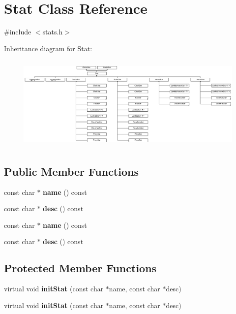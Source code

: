 \hypertarget{classStat}{\section{Stat Class Reference}
\label{classStat}
}


{\ttfamily \#include $<$stats.\-h$>$}

Inheritance diagram for Stat\-:\begin{figure}[H]
\begin{center}
\leavevmode
\includegraphics[height=4.696774cm]{classStat}
\end{center}
\end{figure}
\subsection*{Public Member Functions}
\begin{DoxyCompactItemize}
\item 
\hypertarget{classStat_aea49cf6f8f4f7e5e979bfc7b4530d7f7}{const char $\ast$ {\bfseries name} () const }\label{classStat_aea49cf6f8f4f7e5e979bfc7b4530d7f7}

\item 
\hypertarget{classStat_a698789405d2c18bfbdb405d63df088cb}{const char $\ast$ {\bfseries desc} () const }\label{classStat_a698789405d2c18bfbdb405d63df088cb}

\item 
\hypertarget{classStat_aea49cf6f8f4f7e5e979bfc7b4530d7f7}{const char $\ast$ {\bfseries name} () const }\label{classStat_aea49cf6f8f4f7e5e979bfc7b4530d7f7}

\item 
\hypertarget{classStat_a698789405d2c18bfbdb405d63df088cb}{const char $\ast$ {\bfseries desc} () const }\label{classStat_a698789405d2c18bfbdb405d63df088cb}

\end{DoxyCompactItemize}
\subsection*{Protected Member Functions}
\begin{DoxyCompactItemize}
\item 
\hypertarget{classStat_ac730651cf624a85fd23a0ff56e1804a3}{virtual void {\bfseries init\-Stat} (const char $\ast$name, const char $\ast$desc)}\label{classStat_ac730651cf624a85fd23a0ff56e1804a3}

\item 
\hypertarget{classStat_ac730651cf624a85fd23a0ff56e1804a3}{virtual void {\bfseries init\-Stat} (const char $\ast$name, const char $\ast$desc)}\label{classStat_ac730651cf624a85fd23a0ff56e1804a3}

\end{DoxyCompactItemize}
